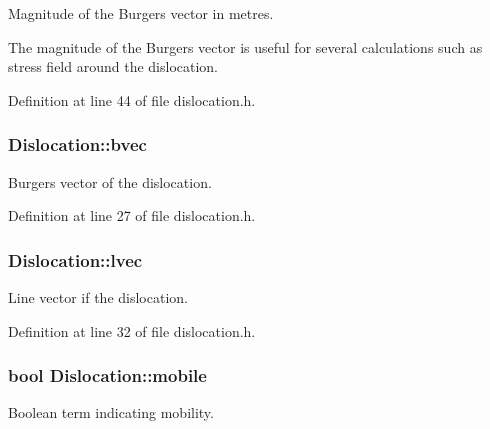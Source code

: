 Magnitude of the Burgers vector in metres. 

The magnitude of the Burgers vector is useful for several calculations such as stress field around the dislocation. 

Definition at line 44 of file dislocation.\-h.

\hypertarget{classDislocation_aad45c2eaade195f374707afb648ed17e}{
\subsubsection[{bvec}]{ Dislocation\-::bvec\hspace{0.3cm}{\ttfamily [protected]}}}\label{d3/dc6/classDislocation_aad45c2eaade195f374707afb648ed17e}


Burgers vector of the dislocation. 



Definition at line 27 of file dislocation.\-h.

\hypertarget{classDislocation_a69d16092777d9ead2d4eedf7c3d47877}{
\subsubsection[{lvec}]{ Dislocation\-::lvec\hspace{0.3cm}{\ttfamily [protected]}}}\label{d3/dc6/classDislocation_a69d16092777d9ead2d4eedf7c3d47877}


Line vector if the dislocation. 



Definition at line 32 of file dislocation.\-h.

\hypertarget{classDislocation_a62c80daa260a3301baf1dceaab5d23d0}{
\subsubsection[{mobile}]{\setlength{\rightskip}{0pt plus 5cm}bool Dislocation\-::mobile\hspace{0.3cm}{\ttfamily [protected]}}}\label{d3/dc6/classDislocation_a62c80daa260a3301baf1dceaab5d23d0}


Boolean term indicating mobility. 

